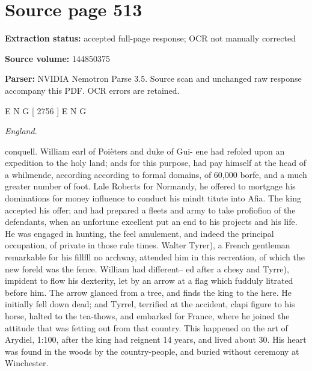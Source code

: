 \clearpage
\section{Source page 513}
\textbf{Extraction status:} accepted full-page response; OCR not manually corrected\par
\textbf{Source volume:} 144850375\par
\textbf{Parser:} NVIDIA Nemotron Parse 3.5. Source scan and unchanged raw response accompany this PDF. OCR errors are retained.\par\medskip
E N G [ 2756 ] E N G\par\medskip
{\small\itshape England.\par}\medskip
conquell. William earl of Poièters and duke of Gui- ene had refoled upon an expedition to the holy land; ands for this purpose, had pay himself at the head of a whilmende, according according to formal domains, of 60,000 borfe, and a much greater number of foot. Lale Roberts for Normandy, he offered to mortgage his dominations for money influence to conduct his mindt titute into Afia. The king accepted his offer; and had prepared a fleets and army to take profiofion of the defendants, when an unfortune excellent put an end to his projects and his life. He was engaged in hunting, the feel amulement, and indeed the principal occupation, of private in those rule times. Walter Tyrer), a French gentleman remarkable for his fillfll no archway, attended him in this recreation, of which the new foreld was the fence. William had different– ed after a chesy and Tyrre), impident to flow his dexterity, let by an arrow at a flag which fudduly litrated before him. The arrow glanced from a tree, and finds the king to the here. He initially fell down dead; and Tyrrel, terrified at the accident, clapi figure to his horse, halted to the tea-thows, and embarked for France, where he joined the attitude that was fetting out from that country. This happened on the art of Arydiel, 1:100, after the king had reignent 14 years, and lived about 30. His heart was found in the woods by the country-people, and buried without ceremony at Winchester.\par\medskip
